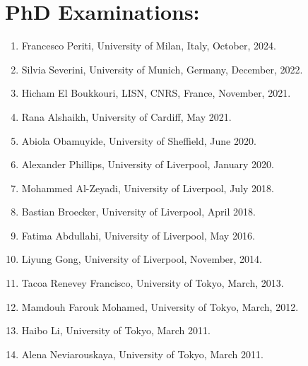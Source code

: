 \documentclass[a4paper,11pt]{article}
\begin{document}
\section{PhD Examinations:}
\begin{enumerate}
\item Francesco Periti, University of Milan, Italy, October, 2024.
\item Silvia Severini, University of Munich, Germany, December, 2022.
\item Hicham El Boukkouri, LISN, CNRS, France, November, 2021.
\item Rana Alshaikh, University of Cardiff, May 2021.
\item Abiola Obamuyide, University of Sheffield, June 2020.
\item Alexander Phillips, University of Liverpool, January 2020.
\item Mohammed Al-Zeyadi, University of Liverpool, July 2018.
\item Bastian Broecker, University of Liverpool, April 2018.
\item Fatima Abdullahi, University of Liverpool, May 2016.
\item Liyung Gong, University of Liverpool, November, 2014.
\item Tacoa Renevey Francisco, University of Tokyo, March, 2013.
\item Mamdouh Farouk Mohamed, University of Tokyo, March, 2012.
\item Haibo Li, University of Tokyo, March 2011.
\item Alena Neviarouskaya, University of Tokyo, March 2011.
\end{enumerate}




\end{document}

